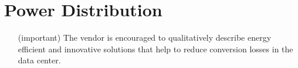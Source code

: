 \section{Power Distribution}
\begin{itemize}
\item[(important)]
The vendor is encouraged to qualitatively describe energy efficient and innovative solutions that help to reduce conversion losses in the data center.
\end{itemize}

